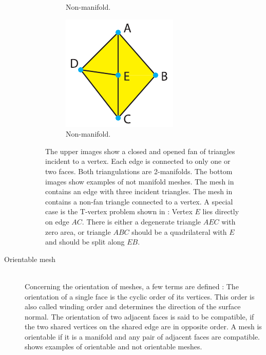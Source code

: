 \begin{description}
\begin{figure}[H]
\begin{subfigure}[t]{0.32\textwidth}
			\caption{
				Non-manifold.
			}
			\label{fig:non_manifold_vertex}
		\end{subfigure}
		\begin{subfigure}[t]{0.32\textwidth}
			\centering
			\includegraphics[width=\textwidth]{images/t_vertex}
			\caption{
				Non-manifold.
				}
			\label{fig:t_vertex}
		\end{subfigure}
		\caption{
			The upper images show a closed and opened fan of triangles incident to a vertex.
			Each edge is connected to only one or two faces.
			Both triangulations are 2-manifolds.
			The bottom images show examples of not manifold meshes.
			The mesh in  contains an edge with three incident triangles.
			The mesh in  contains a non-fan triangle connected to a vertex.
			A special case is the T-vertex problem shown in :
			Vertex $E$ lies directly on edge $AC$.
			There is either a degenerate triangle $AEC$ with zero area, or triangle $ABC$ should be a quadrilateral with $E$ and should be split along $EB$.
		}
		\label{fig:manifold}
	\end{figure}


	\item[Orientable mesh] \hfill \\
	Concerning the orientation of meshes, a few terms are defined \cite{mesh_basics}:
	The orientation of a single face is the cyclic order of its vertices.
	This order is also called winding order and determines the direction of the surface normal.
	The orientation of two adjacent faces is said to be compatible, if the two shared vertices on the shared edge are in opposite order.
	A mesh is orientable if it is a manifold and any pair of adjacent faces are compatible.
	 shows examples of orientable and not orientable meshes.


\end{description}
